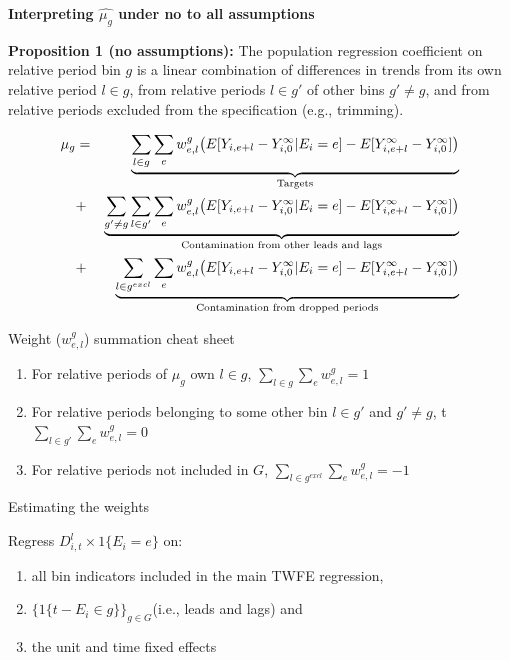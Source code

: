\documentclass{beamer}
\begin{document}
\begin{frame}[plain, shrink=20]
\begin{center}
\textbf{Interpreting $\widehat{\mu_g}$ under no to all assumptions}
\end{center}

\textbf{Proposition 1 (no assumptions):} The population regression coefficient on relative period bin $g$ is a linear combination of differences in trends from its own relative period $l \in g$, from relative periods $l \in g'$ of other bins $g' \neq g$, and from relative periods excluded from the specification (e.g., trimming). 

\begin{eqnarray*}
\mu_g &=& \underbrace{\sum_{l \in g} \sum_{e} w^g_{e,l} \big ( E[Y_{i,e+l} - Y^{\infty}_{i,0} | E_i = e] - E[Y^{\infty}_{i,e+l} - Y^{\infty}_{i,0}] \big )}_{\mathclap{\text{Targets}}} \\
&+& \underbrace{\sum_{g' \neq g} \sum_{l \in g'} \sum_e w^g_{e,l} \big ( E[Y_{i,e+l} - Y^{\infty}_{i,0} | E_i=e] - E[Y^{\infty}_{i,e+l} - Y^{\infty}_{i,0}] \big )}_{\mathclap{\text{Contamination from other leads and lags}}} \\
&+&  \underbrace{\sum_{l \in g^{excl}} \sum_{e} w^g_{e,l} \big ( E[Y_{i,e+l} - Y^{\infty}_{i,0} | E_i=e] - E[Y^{\infty}_{i,e+l} - Y^{\infty}_{i,0}] \big )}_{\mathclap{\text{Contamination from dropped periods}}} 
\end{eqnarray*}

\bigskip


\end{frame}

\begin{frame}{Weight ($w^g_{e,l}$) summation cheat sheet}

\begin{enumerate}
\item For relative periods of $\mu_g$ own $l \in g$, $\sum_{l \in g}\sum_ew^g_{e,l}=1$
\item For relative periods belonging to some other bin $l\in g'$ and $g' \neq g$, t $\sum_{l \in g'}\sum_ew^g_{e,l} = 0$
\item For relative periods not included in $G$, $\sum_{l \in g^{excl}} \sum_e w^g_{e,l} = -1$
\end{enumerate}

\end{frame}




\begin{frame}{Estimating the weights}

Regress $D^l_{i,t} \times 1\{E_i=e \}$ on:

\begin{enumerate}
\item all bin indicators included in the main TWFE regression, 
\item $\{ 1\{ t-E_i \in g \} \}_{g \in G}$(i.e., leads and lags) and 
\item the unit and time fixed effects
\end{enumerate}

\end{frame}
\end{document}

